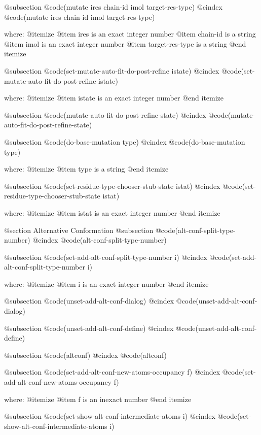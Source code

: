 @subsection @code{(mutate ires chain-id imol target-res-type)}
@cindex @code{(mutate ires chain-id imol target-res-type)}
 
where: 
 @itemize 
     @item ires is an exact integer number
     @item chain-id is a string
     @item imol is an exact integer number
     @item target-res-type is a string
 @end itemize


@subsection @code{(set-mutate-auto-fit-do-post-refine istate)}
@cindex @code{(set-mutate-auto-fit-do-post-refine istate)}
 
where: 
 @itemize 
     @item istate is an exact integer number
 @end itemize


@subsection @code{(mutate-auto-fit-do-post-refine-state)}
@cindex @code{(mutate-auto-fit-do-post-refine-state)}
 
@subsection @code{(do-base-mutation type)}
@cindex @code{(do-base-mutation type)}
 
where: 
 @itemize 
     @item type is a string
 @end itemize


@subsection @code{(set-residue-type-chooser-stub-state istat)}
@cindex @code{(set-residue-type-chooser-stub-state istat)}
 
where: 
 @itemize 
     @item istat is an exact integer number
 @end itemize



@section Alternative Conformation 
@subsection @code{(alt-conf-split-type-number)}
@cindex @code{(alt-conf-split-type-number)}
 
@subsection @code{(set-add-alt-conf-split-type-number i)}
@cindex @code{(set-add-alt-conf-split-type-number i)}
 
where: 
 @itemize 
     @item i is an exact integer number
 @end itemize


@subsection @code{(unset-add-alt-conf-dialog)}
@cindex @code{(unset-add-alt-conf-dialog)}
 
@subsection @code{(unset-add-alt-conf-define)}
@cindex @code{(unset-add-alt-conf-define)}
 
@subsection @code{(altconf)}
@cindex @code{(altconf)}
 
@subsection @code{(set-add-alt-conf-new-atoms-occupancy f)}
@cindex @code{(set-add-alt-conf-new-atoms-occupancy f)}
 
where: 
 @itemize 
     @item f is an inexact number
 @end itemize


@subsection @code{(set-show-alt-conf-intermediate-atoms i)}
@cindex @code{(set-show-alt-conf-intermediate-atoms i)}
 
